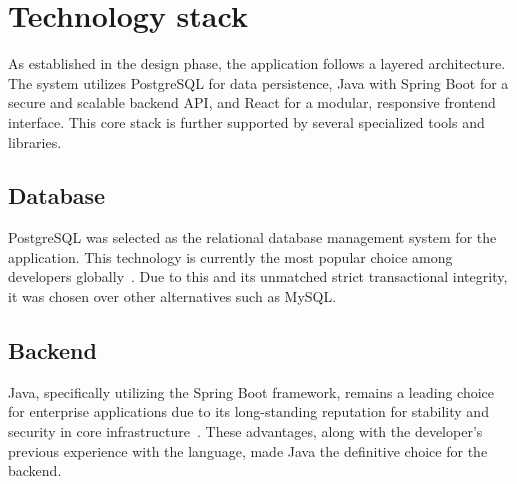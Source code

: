 \documentclass{ctuthesis}
\begin{document}
\section{Technology stack}
As established in the design phase, the application follows a layered architecture. The system utilizes PostgreSQL for data persistence, Java with Spring Boot for a secure and scalable backend API, and React for a modular, responsive frontend interface. This core stack is further supported by several specialized tools and libraries.

\subsection{Database}
PostgreSQL was selected as the relational database management system for the application. This technology is currently the most popular choice among developers globally~\cite{postgresql}. Due to this and its unmatched strict transactional integrity, it was chosen over other alternatives such as MySQL.

\subsection{Backend}
Java, specifically utilizing the Spring Boot framework, remains a leading choice for enterprise applications due to its long-standing reputation for stability and security in core infrastructure~\cite{java}. These advantages, along with the developer's previous experience with the language, made Java the definitive choice for the backend.
\end{document}
